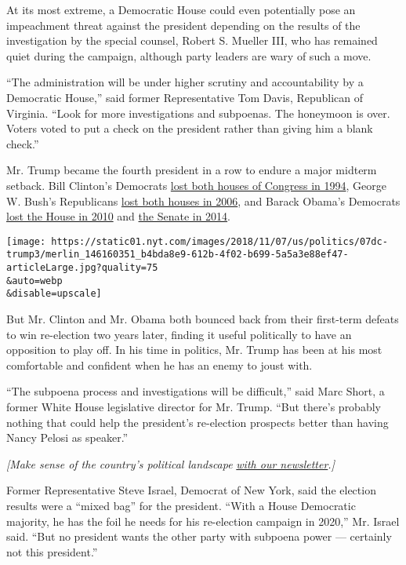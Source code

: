 At its most extreme, a Democratic House could even potentially pose an
impeachment threat against the president depending on the results of the
investigation by the special counsel, Robert S. Mueller III, who has
remained quiet during the campaign, although party leaders are wary of
such a move.

``The administration will be under higher scrutiny and accountability by
a Democratic House,'' said former Representative Tom Davis, Republican
of Virginia. ``Look for more investigations and subpoenas. The honeymoon
is over. Voters voted to put a check on the president rather than giving
him a blank check.''

Mr. Trump became the fourth president in a row to endure a major midterm
setback. Bill Clinton's Democrats
\href{https://www.nytimes.com/1994/11/12/us/1994-election-white-house-memo-defeat-clinton-aides-find-their-silver-lining.html}{lost
both houses of Congress in 1994}, George W. Bush's Republicans
\href{https://www.nytimes.com/2006/11/10/us/politics/10elect.html}{lost
both houses in 2006}, and Barack Obama's Democrats
\href{https://www.nytimes.com/2010/11/03/us/politics/03elect.html}{lost
the House in 2010} and
\href{https://www.nytimes.com/2014/11/05/us/politics/midterm-elections.html}{the
Senate in 2014}.

\texttt{[image: https://static01.nyt.com/images/2018/11/07/us/politics/07dc-trump3/merlin\_146160351\_b4bda8e9-612b-4f02-b699-5a5a3e88ef47-articleLarge.jpg?quality=75\\\&auto=webp\\\&disable=upscale]}

But Mr. Clinton and Mr. Obama both bounced back from their first-term
defeats to win re-election two years later, finding it useful
politically to have an opposition to play off. In his time in politics,
Mr. Trump has been at his most comfortable and confident when he has an
enemy to joust with.

``The subpoena process and investigations will be difficult,'' said Marc
Short, a former White House legislative director for Mr. Trump. ``But
there's probably nothing that could help the president's re-election
prospects better than having Nancy Pelosi as speaker.''

\emph{{[}Make sense of the country's political landscape}
\emph{\href{https://www.nytimes.com/newsletters/politics?smid=rd\%3Faction\%3Dclick\&module=inline\&pgtype=Article}{with
our newsletter}.{]}}

Former Representative Steve Israel, Democrat of New York, said the
election results were a ``mixed bag'' for the president. ``With a House
Democratic majority, he has the foil he needs for his re-election
campaign in 2020,'' Mr. Israel said. ``But no president wants the other
party with subpoena power --- certainly not this president.''

